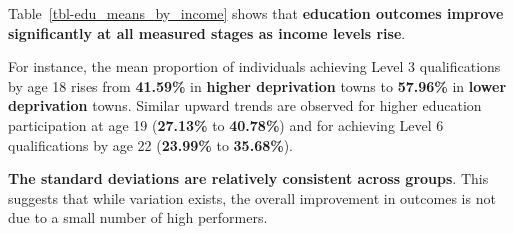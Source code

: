 \documentclass[11pt,en]{../tex/elegantpaper}
\begin{document}
Table~\ref{tbl-edu_means_by_income} shows that \textbf{education
outcomes improve significantly at all measured stages as income levels
rise}.

For instance, the mean proportion of individuals achieving Level 3
qualifications by age 18 rises from \textbf{41.59\%} in \textbf{higher
deprivation} towns to \textbf{57.96\%} in \textbf{lower deprivation}
towns. Similar upward trends are observed for higher education
participation at age 19 (\textbf{27.13\%} to \textbf{40.78\%}) and for
achieving Level 6 qualifications by age 22 (\textbf{23.99\%} to
\textbf{35.68\%}).

\textbf{The standard deviations are relatively consistent across
groups}. This suggests that while variation exists, the overall
improvement in outcomes is not due to a small number of high performers.
\end{document}

